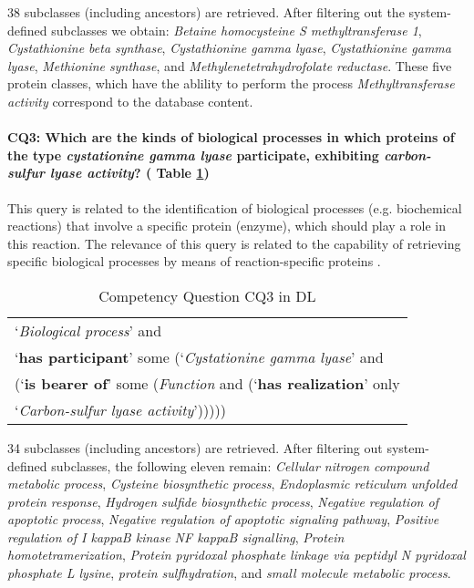 38 subclasses (including ancestors) are retrieved. After filtering out the system-defined subclasses we obtain: \textit{Betaine homocysteine S methyltransferase 1}, \textit{Cystathionine beta synthase}, \textit{Cystathionine gamma lyase}, \textit{Cystathionine gamma lyase}, \textit{Methionine synthase}, and \textit{Methylenetetrahydrofolate reductase}. These five protein classes, which have the ablility to perform the process \textit{Methyltransferase activity} correspond to the database content.

\paragraph{CQ3: Which are the kinds of biological processes in which proteins of the type \textit{cystationine gamma lyase} participate, exhibiting \textit{carbon-sulfur lyase activity}? ( Table \ref{table:cq3})}
This query is related to the identification of biological processes (e.g. biochemical reactions) that involve a specific protein (enzyme), which should play a role in this reaction. The relevance of this query is related to the capability of retrieving specific biological processes by means of reaction-specific proteins . 
\begin{table}[H]
	\caption{Competency Question CQ3 in DL}
	\label{table:cq3}
		\centering
	\begin{tabular}{p{3in}}
		\hline
			`\textit{Biological process}' and \\
			\hspace{0.5cm} `\textbf{has participant}'  some (`\textit{Cystationine gamma lyase}' and \\
			\hspace{1cm} (`\textbf{is bearer of}'  some (\textit{Function} and (`\textbf{has realization}'  only \\
			\hspace{2cm} `\textit{Carbon-sulfur lyase activity}'))))) \\
		\hline
	\end{tabular} 
\end{table}

34 subclasses (including ancestors) are retrieved. After filtering out system-defined subclasses, the following eleven remain: \textit{Cellular nitrogen compound metabolic process}, \textit{Cysteine biosynthetic process}, \textit{Endoplasmic reticulum unfolded protein response}, \textit{Hydrogen sulfide biosynthetic process}, \textit{Negative regulation of apoptotic process}, \textit{Negative regulation of apoptotic signaling pathway}, \textit{Positive regulation of I kappaB kinase NF kappaB signalling}, \textit{Protein homotetramerization}, \textit{Protein pyridoxal phosphate linkage via peptidyl N pyridoxal phosphate L lysine}, \textit{protein sulfhydration}, and \textit{small molecule metabolic process}.

